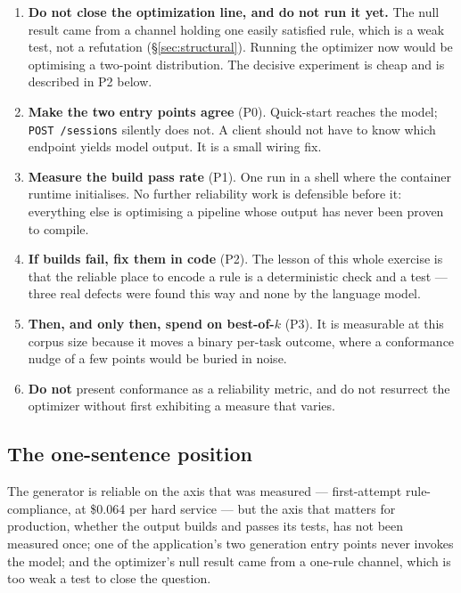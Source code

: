 \documentclass[11pt,a4paper]{article}
\begin{document}
\begin{enumerate}[leftmargin=1.4em]
  \item \textbf{Do not close the optimization line, and do not run it yet.} The null
  result came from a channel holding one easily satisfied rule, which is a weak test,
  not a refutation (\S\ref{sec:structural}). Running the optimizer now would be
  optimising a two-point distribution. The decisive experiment is cheap and is
  described in P2 below.
  \item \textbf{Make the two entry points agree} (P0). Quick-start reaches the
  model; \texttt{POST /sessions} silently does not. A client should not have to know
  which endpoint yields model output. It is a small wiring fix.
  \item \textbf{Measure the build pass rate} (P1). One run in a shell where the
  container runtime initialises. No further reliability work is defensible before it:
  everything else is optimising a pipeline whose output has never been proven to
  compile.
  \item \textbf{If builds fail, fix them in code} (P2). The lesson of this whole
  exercise is that the reliable place to encode a rule is a deterministic check and a
  test --- three real defects were found this way and none by the language model.
  \item \textbf{Then, and only then, spend on best-of-$k$} (P3). It is measurable at
  this corpus size because it moves a binary per-task outcome, where a conformance
  nudge of a few points would be buried in noise.
  \item \textbf{Do not} present conformance as a reliability metric, and do not
  resurrect the optimizer without first exhibiting a measure that varies.
\end{enumerate}

\subsection*{The one-sentence position}

The generator is reliable on the axis that was measured --- first-attempt
rule-compliance, at \$0.064 per hard service --- but the axis that matters for
production, whether the output builds and passes its tests, has not been measured
once; one of the application's two generation entry points never invokes the model;
and the optimizer's null result came from a one-rule channel, which is too weak a test
to close the question.
\end{document}

